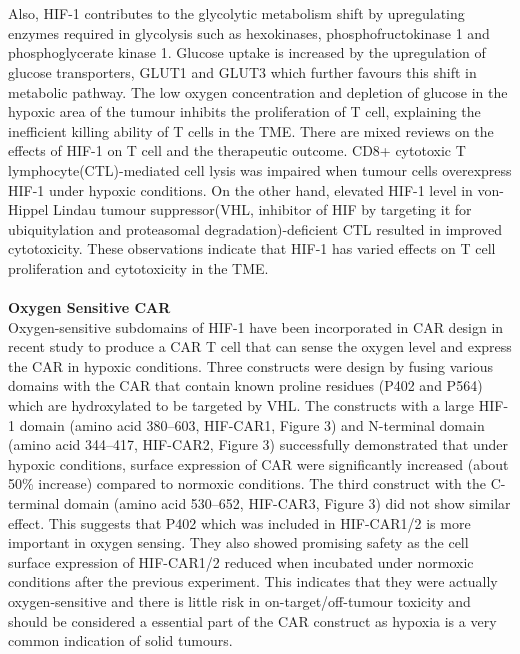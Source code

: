 \documentclass[12pt,oneside]{report}
\begin{document}
\\\\Also, HIF-1\textalpha{} contributes to the glycolytic metabolism shift by upregulating enzymes required in glycolysis such as hexokinases, phosphofructokinase 1 and phosphoglycerate kinase 1\citep{hypoxia-3}. Glucose uptake is increased by the upregulation of glucose transporters, GLUT1 and GLUT3\citep{hypoxia-4} which further favours this shift in metabolic pathway. The low oxygen concentration and depletion of glucose in the hypoxic area of the tumour inhibits the proliferation of T cell\citep{CD28-5, hypoxia-5}, explaining the inefficient killing ability of T cells in the TME. There are mixed reviews on the effects of HIF-1\textalpha{} on T cell and the therapeutic outcome. CD8+ cytotoxic T lymphocyte(CTL)-mediated cell lysis was impaired when tumour cells overexpress HIF-1\textalpha{} under hypoxic conditions\citep{hypoxia-6}. On the other hand, elevated HIF-1\textalpha{} level in von-Hippel Lindau tumour suppressor(VHL, inhibitor of HIF by targeting it for ubiquitylation and proteasomal degradation)-deficient CTL\citep{hypoxia-7} resulted in improved cytotoxicity. These observations indicate that HIF-1\textalpha{} has varied effects on T cell proliferation and cytotoxicity in the TME. \\\\
\textbf{Oxygen Sensitive CAR} \\
Oxygen-sensitive subdomains of HIF-1\textalpha{} have been incorporated in CAR design in recent study to produce a CAR T cell that can sense the oxygen level and express the CAR in hypoxic conditions\cite{hypoxia-8}. Three constructs were design by fusing various domains with the CAR that contain known proline residues (P402 and P564) which are hydroxylated to be targeted by VHL. The constructs with a large HIF-1\textalpha{} domain (amino acid 380--603, HIF-CAR1, Figure 3) and N-terminal domain (amino acid 344--417, HIF-CAR2, Figure 3) successfully demonstrated that under hypoxic conditions, surface expression of CAR were significantly increased (about 50\% increase) compared to normoxic conditions\cite{hypoxia-8}. The third construct with the C-terminal domain (amino acid 530--652, HIF-CAR3, Figure 3) did not show similar effect. This suggests that P402 which was included in HIF-CAR1/2 is more important in oxygen sensing. They also showed promising safety as the cell surface expression of HIF-CAR1/2 reduced when incubated under normoxic conditions after the previous experiment\cite{hypoxia-8}. This indicates that they were actually oxygen-sensitive and there is little risk in on-target/off-tumour toxicity and should be considered a essential part of the CAR construct as hypoxia is a very common indication of solid tumours. 
\end{document}
